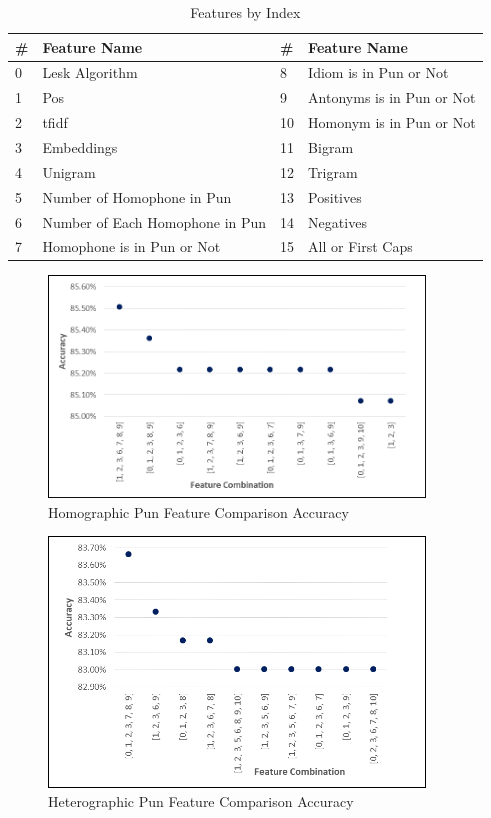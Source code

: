 \documentclass{article}
\begin{document}
\begin{table}
\caption{Features by Index}\label{tab:List_of_features} 
\begin{center}
\begin{tabular}{l l l l} 
\toprule
\textbf{\#} &\textbf{Feature Name}		& \textbf{\#} &	\textbf{Feature Name}\\
\midrule
0	&	Lesk Algorithm					& 8		&	Idiom is in Pun or Not\\
1	&	Pos								& 9		&	Antonyms is in Pun or Not\\
2	&	tfidf							& 10	&	Homonym is in Pun or Not\\
3	&	Embeddings						& 11	&	Bigram\\
4	&	Unigram							& 12	&	Trigram\\
5	&	Number of Homophone in Pun		& 13	&	Positives\\
6	&	Number of Each Homophone in Pun & 14	&	Negatives\\
7	&	Homophone is in Pun or Not		& 15 &	All or First Caps\\
\bottomrule
\end{tabular}
\end{center}
\end{table}

\begin{figure}
  \centering
  \includegraphics[width=10cm]{figures/Accuracy_on_Test_Set_for_Homographic_Pun.png}
  \caption{Homographic Pun Feature Comparison Accuracy}\label{fig:ACC_Test_Homo}
\end{figure}

\begin{figure}
  \centering
  \includegraphics[width=10cm]{figures/Accuracy_on_Test_Set_for_Heterographic_Pun.png}
  \caption{Heterographic Pun Feature Comparison Accuracy}\label{fig:ACC_Test_Hetero}
\end{figure}
\end{document}
